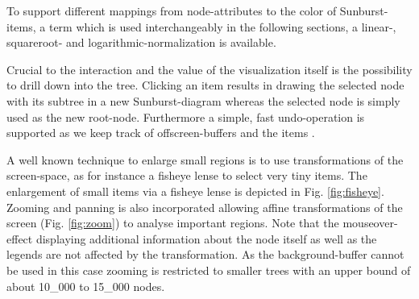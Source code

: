 \begin{itemize}

To support different mappings from node-attributes to the color of Sunburst-items, a term which is used interchangeably in the following sections, a linear-, squareroot- and logarithmic-normalization is available.

Crucial to the interaction and the value of the visualization itself is the possibility to drill down into the tree. Clicking an item results in drawing the selected node with its subtree in a new Sunburst-diagram whereas the selected node is simply used as the new root-node. Furthermore a simple, fast undo-operation is supported as we keep track of offscreen-buffers and the items . %

A well known technique to enlarge small regions is to use transformations of the screen-space, as for instance a fisheye lense to select very tiny items. The enlargement of small items via a fisheye lense is depicted in Fig. \ref{fig:fisheye}. Zooming and panning is also incorporated allowing affine transformations of the screen (Fig. \ref{fig:zoom}) to analyse important regions. Note that the mouseover-effect displaying additional information about the node itself as well as the legends are not affected by the transformation. As the background-buffer cannot be used in this case zooming is restricted to smaller trees with an upper bound of about 10\_000 to 15\_000 nodes.


\end{itemize}
